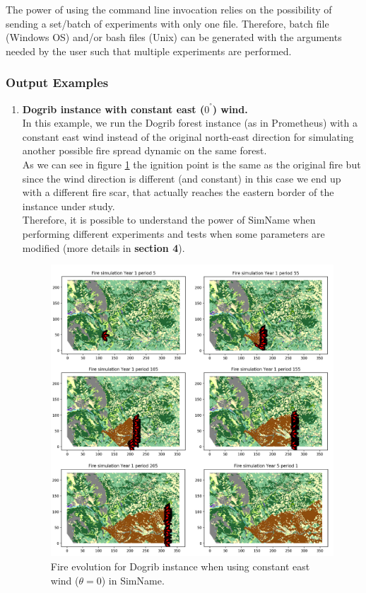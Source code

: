 \documentclass[11pt]{article}
\begin{document}
The power of using the command line invocation relies on the possibility of sending a set/batch of experiments with only one file. Therefore, batch file (Windows OS) and/or bash files (Unix) can be generated with the arguments needed by the user such that multiple experiments are performed.

\newpage

\subsubsection{Output Examples}
\begin{enumerate}
	\item \textbf{Dogrib instance with constant east ($0^°$) wind.}\\
	In this example, we run the Dogrib forest instance (as in Prometheus) with a constant east wind instead of the original north-east direction for simulating another possible fire spread dynamic on the same forest. \\
	
	As we can see in figure \ref{DPE} the ignition point is the same as the original fire but since the wind direction is different (and constant) in this case we end up with a different fire scar, that actually reaches the eastern border of the instance under study. \\

	Therefore, it is possible to understand the power of SimName when performing different experiments and tests when some parameters are modified (more details in \textbf{section 4}).
	
\begin{figure}[h!]
\includegraphics[scale=0.5]{DogribPureEast.png}
\centering
\caption{\label{DPE} Fire evolution for Dogrib instance when using constant east wind ($\theta=0$) in SimName.}
\end{figure}


\end{enumerate}
\end{document}
